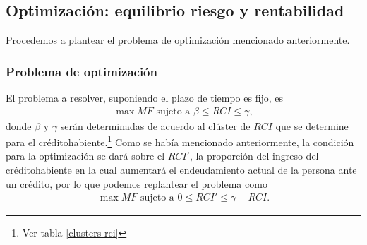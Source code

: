 \subsection{Optimización: equilibrio riesgo y rentabilidad}
Procedemos a plantear el problema de optimización mencionado anteriormente.

\subsubsection{Problema de optimización}
El problema a resolver, suponiendo el plazo de tiempo es fijo, es
\begin{align*}
    \max MF \text{ sujeto a } \beta \leq RCI \leq \gamma,
\end{align*}
donde $\beta$ y $\gamma$ serán determinadas de acuerdo al clúster de $RCI$  que se determine para el créditohabiente.\footnote{Ver tabla \ref{clusters rci}} Como se había mencionado anteriormente, la condición para la optimización se dará sobre el $RCI'$, la proporción del ingreso del créditohabiente en la cual aumentará el endeudamiento actual de la persona ante un crédito, por lo que podemos replantear el problema como
\begin{align*}
    \max MF \text{ sujeto a } 0 \leq RCI' \leq \gamma - RCI.
\end{align*}

